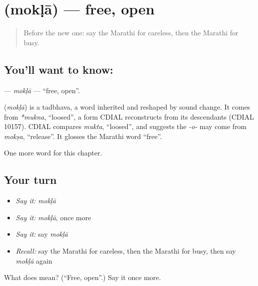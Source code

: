 \section[\texorpdfstring{\mr{मोकळा} (mokḷā)}{मोकळा (mokḷā)}]{ (mokḷā) — free, open}

\label{lesson:MR-C207-mokla}



\begin{quote}
Before the new one: say the Marathi for careless, then the Marathi for busy.
\end{quote}

\subsection*{You'll want to know: }
\textbf{} — \emph{mokḷā} — \textquotedblleft{}free, open\textquotedblright{}.

\begin{cousinweb}
\textbf{} (\emph{mokḷā}) is a tadbhava, a word inherited and reshaped by sound change. It comes from \emph{*mukna}, \textquotedblleft{}loosed\textquotedblright{}, a form CDIAL reconstructs from its descendants (CDIAL 10157). CDIAL compares \emph{mukta}, \textquotedblleft{}loosed\textquotedblright{}, and suggests the \emph{-o-} may come from \emph{mokṣa}, \textquotedblleft{}release\textquotedblright{}. It glosses the Marathi word \textquotedblleft{}free\textquotedblright{}.
\end{cousinweb}

\begin{grammarlens}[title={What you've built}]
One more word for this chapter.
\end{grammarlens}

\subsection*{Your turn}
\begin{itemize}
\raggedright
  \item \emph{Say it:} \emph{mokḷā}
  \item \emph{Say it:} \emph{mokḷā}, once more
  \item \emph{Say it:} say \emph{mokḷā}
  \item \emph{Recall:} say the Marathi for careless, then the Marathi for busy, then say \emph{mokḷā} again
\end{itemize}

\begin{tcolorbox}[breakable,colback=teal!4,colframe=teal!35!black,title={Before you move on}]
What does  mean? (\textquotedblleft{}Free, open\textquotedblright{}.) Say it once more.
\end{tcolorbox}
